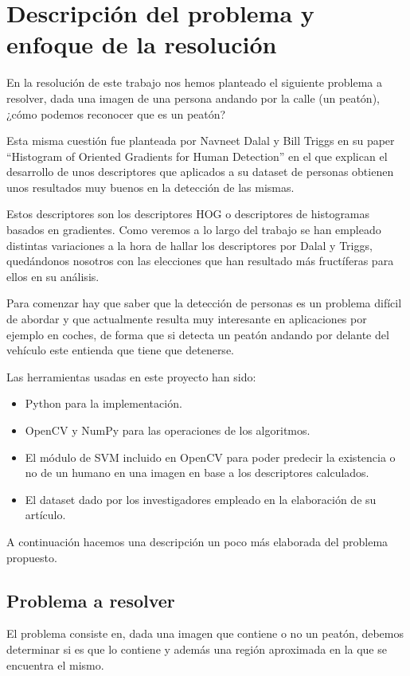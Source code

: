 \documentclass[a4paper,12pt]{article}
\begin{document}
\section{Descripción del problema y enfoque de la resolución}

En la resolución de este trabajo nos hemos planteado el siguiente problema a resolver, dada una imagen de una persona andando por la calle (un peatón), ¿cómo podemos reconocer que es un peatón?

Esta misma cuestión fue planteada por Navneet Dalal y Bill Triggs en su paper ``Histogram of Oriented Gradients for Human Detection'' en el que explican el desarrollo de unos descriptores que aplicados a su dataset de personas obtienen unos resultados muy buenos en la detección de las mismas. 

Estos descriptores son los descriptores HOG o descriptores de histogramas basados en gradientes. Como veremos a lo largo del trabajo se han empleado distintas variaciones a la hora de hallar los descriptores por Dalal y Triggs, quedándonos nosotros con las elecciones que han resultado más fructíferas para ellos en su análisis. 

Para comenzar hay que saber que la detección de personas es un problema difícil de abordar y que actualmente resulta muy interesante en aplicaciones por ejemplo en coches, de forma que si detecta un peatón andando por delante del vehículo este entienda que tiene que detenerse. 

Las herramientas usadas en este proyecto han sido:
\begin{itemize}
	\item Python para la implementación.
	\item OpenCV y NumPy para las operaciones de los algoritmos.
	\item El módulo de SVM incluido en OpenCV para poder predecir la existencia o no de un humano en una imagen en base a los descriptores calculados.
	\item El dataset dado por los investigadores empleado en la elaboración de su artículo.
\end{itemize}

A continuación hacemos una descripción un poco más elaborada del problema propuesto.

\subsection{Problema a resolver}

El problema consiste en, dada una imagen que contiene o no un peatón, debemos determinar si es que lo contiene y además una región aproximada en la que se encuentra el mismo. 
\end{document}
